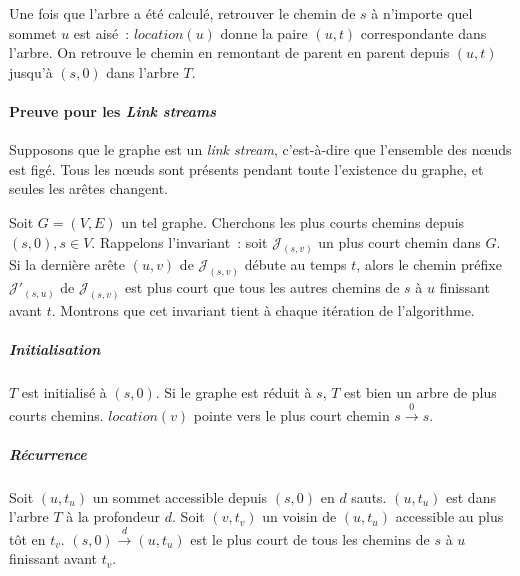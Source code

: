 \documentclass[12pt,a4paper]{article}
\begin{document}
Une fois que l'arbre a été calculé, retrouver le chemin de \(s\) à
n'importe quel sommet \(u\) est aisé~: \(location(u)\) donne la paire
\((u, t)\) correspondante dans l'arbre. On retrouve le chemin en
remontant de parent en parent depuis \((u, t)\) jusqu'à \((s, 0)\)
dans l'arbre \(T\).

\paragraph{Preuve pour les \textit{Link streams}} Supposons que le
graphe est un \textit{link stream}, c'est-à-dire que l'ensemble des
nœuds est figé. Tous les nœuds sont présents pendant toute l'existence
du graphe, et seules les arêtes changent.

Soit \(G = (V, E)\) un tel graphe. Cherchons les plus courts chemins
depuis \((s, 0), s \in V\). Rappelons l'invariant~: soit
\(\mathcal{J}_{(s, v)}\) un plus court chemin dans \(G\). Si la
dernière arête \((u, v)\) de \(\mathcal{J}_{(s, v)}\) débute au temps
\(t\), alors le chemin préfixe \(\mathcal{J}'_{(s, u)}\) de
\(\mathcal{J}_{(s, v)}\) est plus court que tous les autres chemins de
\(s\) à \(u\) finissant avant \(t\). Montrons que cet invariant tient
à chaque itération de l'algorithme.

\subparagraph{Initialisation} \(T\) est initialisé à \((s, 0)\). Si le
graphe est réduit à \(s\), \(T\) est bien un arbre de plus courts
chemins. \(location(v)\) pointe vers le plus court chemin
\(s \xrightarrow{0} s\).

\subparagraph{Récurrence} Soit \((u, t_u)\) un sommet accessible
depuis \((s, 0)\) en \(d\) sauts. \((u, t_u)\) est dans l'arbre \(T\)
à la profondeur \(d\). Soit \((v, t_v)\) un voisin de \((u, t_u)\)
accessible au plus tôt en \(t_v\). \((s, 0) \xrightarrow{d} (u, t_u)\)
est le plus court de tous les chemins de \(s\) à \(u\) finissant avant
\(t_v\). \\
\end{document}
